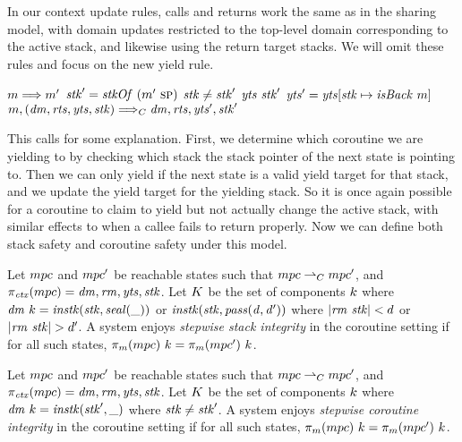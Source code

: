 \documentclass[acmsmall,review,anonymous]{acmart}\settopmatter{printfolios=true,printccs=false,printacmref=false}
\newcommand*{\rsp}{\textsc{sp}}
\begin{document}
In our context update rules, calls and returns work the same as in the sharing model,
with domain updates restricted to the top-level domain corresponding to the active stack,
and likewise using the return target stacks. We will omit these rules and focus on the new yield rule.

\judgmentthreebr[Yield]
                {\(\codemap ~ (\mach ~ \PCname) = \yieldmap\)}
                {\(m \Longrightarrow m'\)}
                {\(\stackid' = \stackof ~ (\mach'~ \rsp)\)}
                {\(\mathit{stk} \not = \mathit{stk}'\)}
                {\(\mathit{yts} ~ \mathit{stk}'\)}
                {\(\mathit{yts}' = \mathit{yts}[\mathit{stk} \mapsto \mathit{isBack} ~ m]\)}
                {\(m,(\mathit{dm},\mathit{rts},\mathit{yts},\mathit{stk}) \Longrightarrow_C \mathit{dm},\mathit{rts},\mathit{yts}',\mathit{stk}'\)}

This calls for some explanation. First, we determine which coroutine we are yielding to by
checking which stack the stack pointer of the next state is pointing to. Then we can only yield
if the next state is a valid yield target for that stack, and we update the yield target for
the yielding stack. So it is once again possible for a coroutine to claim to yield but not
actually change the active stack, with similar effects to when a callee fails to return properly.
Now we can define both stack safety and coroutine safety under this model.

 Let \(mpc\) and \(mpc'\) be reachable states such that
\(mpc \overset{}{\rightharpoonup}_C mpc'\), and \(\pi_{\mathit{ctx}}(mpc) = \mathit{dm},\mathit{rm},\mathit{yts},\mathit{stk}\).
Let \(K\) be the set of components \(k\) where
\(\mathit{dm} ~ k = \mathit{instk}(\mathit{stk},\mathit{seal(\_)})\) or \(\mathit{instk}(\mathit{stk},\mathit{pass(d,d')})\)
where \(|\mathit{rm} ~ \mathit{stk}| < d\) or \(|\mathit{rm} ~ \mathit{stk}| > d'\). A system enjoys
{\em stepwise stack integrity} in the coroutine setting if for all
such states, \(\pi_m(mpc) ~ k = \pi_m(mpc') ~ k\).

 Let \(mpc\) and \(mpc'\) be reachable states such that
\(mpc \overset{}{\rightharpoonup}_C mpc'\), and \(\pi_{\mathit{ctx}}(mpc) = \mathit{dm},\mathit{rm},\mathit{yts},\mathit{stk}\).
Let \(K\) be the set of components \(k\) where
\(\mathit{dm} ~ k = \mathit{instk}(\mathit{stk}',\_)\) where \(\mathit{stk} \not = \mathit{stk}'\).
A system enjoys {\em stepwise coroutine integrity} in the coroutine setting if for all
such states, \(\pi_m(mpc) ~ k = \pi_m(mpc') ~ k\).
\end{document}

